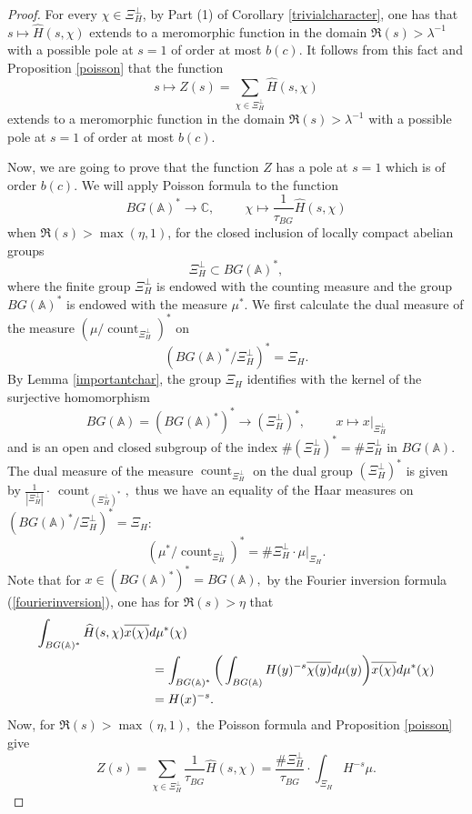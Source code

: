 \documentclass[a4paper,english,12pt]{amsart}
\newcommand{\CC}{\mathbb{C}}
\newcommand{\AAA}{\mathbb A}
\newcommand{\wH}{\widehat H}
\DeclareMathOperator{\coun}{count}
\numberwithin{equation}{subsection}
\begin{document}
\begin{proof}
For every $\chi\in \Xi_H^{\perp}$, by Part (1) of Corollary \ref{trivialcharacter}, one has that $s\mapsto\wH(s,\chi)$ extends to a meromorphic function in the domain $\Re(s)>\lambda^{-1}$ with a possible pole at $s=1$ of order at most $b(c)$. It follows from this fact and Proposition \ref{poisson} that the function $$s\mapsto Z(s)=\sum _{\chi\in \Xi_H^\perp}\wH(s,\chi)$$ extends to a meromorphic function in the domain $\Re(s)>\lambda^{-1}$ with a possible pole at $s=1$ of order at most $b(c)$.

Now, we are going to prove that the function $Z$ has a pole at $s=1$ which is of order $b(c)$. We will apply Poisson formula to the function $$BG(\AAA)^*\to\CC,\hspace{1cm}\chi\mapsto \frac{1}{\tau_{BG}}\wH(s,\chi)$$ when $\Re(s)>\max(\eta,1)$, for the closed inclusion of locally compact abelian groups $$\Xi_H^\perp\subset BG(\AAA)^*,$$ where the finite group $\Xi_H^\perp$ is endowed with the counting measure and the group $BG(\AAA)^*$ is endowed with the measure $\mu^*$. We first calculate the dual measure of the measure $(\mu/\coun_{\Xi_H^\perp})^*$ on $$(BG(\AAA)^*/\Xi_H^\perp)^*=\Xi_H.$$ By Lemma \ref{importantchar}, the group $\Xi_H$ identifies with the kernel of the surjective homomorphism $$BG(\AAA)=(BG(\AAA)^*)^*\to (\Xi_H^{\perp})^*,\hspace{1cm}x\mapsto x|_{\Xi_H^\perp}$$ and is an open and closed subgroup of the index $\# (\Xi_H^\perp)^*=\#\Xi_H^\perp$ in $BG(\AAA)$. The dual measure of the measure $\coun_{\Xi_H^\perp}$ on the dual group $(\Xi^\perp_H)^*$ is given by $\frac{1}{|\Xi_H^\perp|}\cdot~\coun_{(\Xi^\perp_H)^*},$ thus we have an equality of the Haar measures on $(BG(\AAA)^*/\Xi_H^\perp)^*=\Xi_H$: $$(\mu^*/\coun_{\Xi_H^\perp})^*=\#\Xi_H^\perp\cdot \mu|_{\Xi_H}.$$ 
Note that for $x\in (BG(\AAA)^*)^*=BG(\AAA),$ by the Fourier inversion formula (\ref{fourierinversion}), one has for $\Re(s)>\eta$ that
\begin{align*}
\int_{BG(\AAA)^*}\wH(s,\chi)\overline{x(\chi)}d\mu^*(\chi)\hskip-1cm&\\&=\int_{BG(\AAA)^*}\bigg(\int_{BG(\AAA)}H(y)^{-s}\overline{\chi(y)}d\mu(y) \bigg)\overline{x(\chi)}d\mu^*(\chi)\\
&= H(x)^{-s}.
\end{align*}
Now, for $\Re(s)>\max(\eta,1),$ the Poisson formula and Proposition \ref{poisson} give $$Z(s)=\sum_{\chi\in\Xi_H^\perp}\frac{1}{\tau_{BG}}\wH(s,\chi)=\frac{\#\Xi_H^\perp}{\tau_{BG}}\cdot\int_{\Xi_H}H^{-s}\mu.$$

\end{proof}
\end{document}
